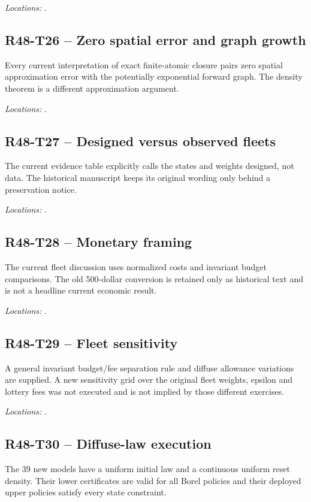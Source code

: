 \noindent\emph{Locations:} .

\subsection{R48-T26 -- Zero spatial error and graph growth}
Every current interpretation of exact finite-atomic closure pairs zero spatial approximation error with the potentially exponential forward graph. The density theorem is a different approximation argument.

\noindent\emph{Locations:} .

\subsection{R48-T27 -- Designed versus observed fleets}
The current evidence table explicitly calls the states and weights designed, not data. The historical manuscript keeps its original wording only behind a preservation notice.

\noindent\emph{Locations:} .

\subsection{R48-T28 -- Monetary framing}
The current fleet discussion uses normalized costs and invariant budget comparisons. The old 500-dollar conversion is retained only as historical text and is not a headline current economic result.

\noindent\emph{Locations:} .

\subsection{R48-T29 -- Fleet sensitivity}
A general invariant budget/fee separation rule and diffuse allowance variations are supplied. A new sensitivity grid over the original fleet weights, epsilon and lottery fees was not executed and is not implied by those different exercises.

\noindent\emph{Locations:} .

\subsection{R48-T30 -- Diffuse-law execution}
The 39 new models have a uniform initial law and a continuous uniform reset density. Their lower certificates are valid for all Borel policies and their deployed upper policies satisfy every state constraint.

